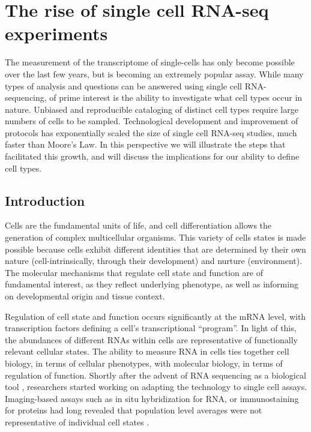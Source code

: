 
\chapter{The rise of single cell RNA-seq experiments} \label{ch:intro}

\graphicspath{{Chapter1/Figs/}}

The measurement of the transcriptome of single-cells has only become possible over the last few years, but is becoming an extremely popular assay. While many types of analysis and questions can be answered using single cell RNA-sequencing, of prime interest is the ability to investigate what cell types occur in nature. Unbiased and reproducible cataloging of distinct cell types require large numbers of cells to be sampled. Technological development and improvement of protocols has exponentially scaled the size of single cell RNA-seq studies, much faster than Moore’s Law. In this perspective we will illustrate the steps that facilitated this growth, and will discuss the implications for our ability to define cell types.

\section{Introduction}

Cells are the fundamental units of life, and cell differentiation allows the generation of complex multicellular organisms. This variety of cells states is made possible because cells exhibit different identities that are determined by their own nature (cell-intrinsically, through their development) and nurture (environment). The molecular mechanisms that regulate cell state and function are of fundamental interest, as they reflect underlying phenotype, as well as informing on developmental origin and tissue context.

Regulation of cell state and function occurs significantly at the mRNA level, with transcription factors defining a cell’s transcriptional “program”. In light of this, the abundances of different RNAs within cells are representative of functionally relevant cellular states. The ability to measure RNA in cells ties together cell biology, in terms of cellular phenotypes, with molecular biology, in terms of regulation of function. Shortly after the advent of RNA sequencing as a biological tool \cite{Mortazavi2008-rq}, researchers started working on adapting the technology to single cell assays. Imaging-based assays such as in situ hybridization for RNA, or immunostaining for proteins had long revealed that population level averages were not representative of individual cell states \cite{Raj2008-wj}.


